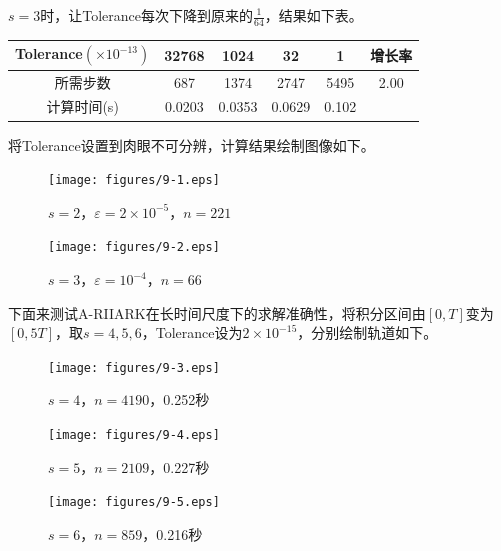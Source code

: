\documentclass[lang=cn,10pt,bibend=bibtex]{elegantbook}
\begin{document}
$s=3$时，让Tolerance每次下降到原来的$\frac{1}{64}$，结果如下表。

\vspace{-.5em}
\begin{table}[H]
  \centering
  \begin{tabular}{c|cccc|c}
    Tolerance$(\times 10^{-13})$ & 32768 & 1024 & 32 & 1 & 增长率 \\ \hline
    所需步数 & 687 & 1374  & 2747 & 5495 & 2.00   \\
    计算时间(s) & 0.0203 & 0.0353 & 0.0629  & 0.102  & 
  \end{tabular}
\end{table}

将Tolerance设置到肉眼不可分辨，计算结果绘制图像如下。

\begin{figure}[H]
  \centering
  \begin{minipage}[t]{0.35\linewidth}
      \centering
      \texttt{[image: figures/9-1.eps]}
      \caption*{\small $s=2$，$\varepsilon=2\times 10^{-5}$，$n=221$}
  \end{minipage}
  \hspace{2em}
  \begin{minipage}[t]{0.35\linewidth}
      \centering
      \texttt{[image: figures/9-2.eps]}
      \caption*{\small $s=3$，$\varepsilon=10^{-4}$，$n=66$}
  \end{minipage}
\end{figure}

下面来测试A-RIIARK在长时间尺度下的求解准确性，将积分区间由$[0,T]$变为$[0,5T]$，取$s=4,5,6$，Tolerance设为$2\times 10^{-15}$，分别绘制轨道如下。

\begin{figure}[H]
  \centering
  \begin{minipage}[t]{0.32\linewidth}
      \centering
      \texttt{[image: figures/9-3.eps]}
      \caption*{\small $s=4$，$n=4190$，0.252秒}
  \end{minipage}
  \hspace{.31em}
  \begin{minipage}[t]{0.32\linewidth}
      \centering
      \texttt{[image: figures/9-4.eps]}
      \caption*{\small $s=5$，$n=2109$，0.227秒}
  \end{minipage}
  \hspace{.31em}
  \begin{minipage}[t]{0.32\linewidth}
      \centering
      \texttt{[image: figures/9-5.eps]}
      \caption*{\small $s=6$，$n=859$，0.216秒}
  \end{minipage}
\end{figure}
\vspace{-.5em}
\end{document}

